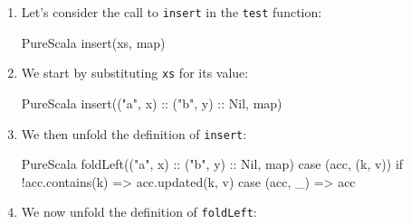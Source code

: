\documentclass[a4paper,twoside]{article}
\newcommand{\RefSec}[1]{Section~\ref{#1}}
\newcommand{\stt}[1]{\texttt{\small{#1}}}
\begin{document}
\begin{enumerate}

\item Let's consider the call to \stt{insert} in the \stt{test} function:

\begin{ShortCode}{PureScala}
insert(xs, map)
\end{ShortCode}

\item We start by substituting \stt{xs} for its value:

\begin{ShortCode}{PureScala}
insert(("a", x) :: ("b", y) :: Nil, map)
\end{ShortCode}

\item We then unfold the definition of \stt{insert}:

\begin{ShortCode}{PureScala}
foldLeft(("a", x) :: ("b", y) :: Nil, map) {
  case (acc, (k, v)) if !acc.contains(k) => acc.updated(k, v)
  case (acc, _)                          => acc
}
\end{ShortCode}

\item We now unfold the definition of \stt{foldLeft}:




\end{enumerate}
\end{document}
